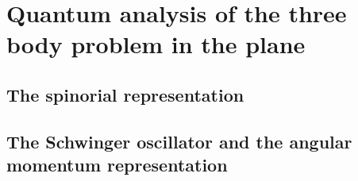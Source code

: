 \chapter{Quantum analysis of the three body problem in the plane}

\section{The spinorial representation}

\section{The Schwinger oscillator and the angular momentum representation}
